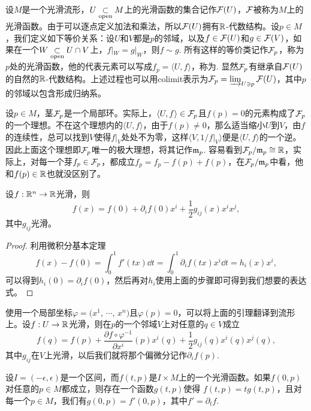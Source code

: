 \begin{para}
设$M$是一个光滑流形，$U\underset{\mathrm{open}}{\subset} M$上的光滑函数的集合记作$\mathcal{F}(U)$，$\mathcal{F}$被称为$M$上的光滑函数。由于可以逐点定义加法和乘法，所以$\mathcal{F}(U)$拥有$\mathbb{R}$-代数结构。设$p\in M$，我们定义如下等价关系：设$U$和$V$都是$p$的邻域，以及$f\in \mathcal{F}(U)$和$g\in \mathcal{F}(V)$，如果在一个$W\underset{\mathrm{open}}{\subset} U\cap V$上，$f|_W=g|_W$，则$f\sim g$. 所有这样的等价类记作$\mathcal{F}_p$，称为$p$处的光滑函数，他的代表元素可以写成$f_p=\langle U,f\rangle$，称为. 显然$\mathcal{F}_p$有继承自$\mathcal{F}(U)$的自然的$\mathbb{R}$-代数结构。上述过程也可以用colimit表示为$\mathcal{F}_p=\varinjlim_{U\ni p}\mathcal{F}(U)$，其中$p$的邻域以包含形成归纳系。

设$p\in M$，茎$\mathcal{F}_p$是一个局部环。实际上，$\langle U,f\rangle \in \mathcal{F}_p$且$f(p)= 0$的元素构成了$\mathcal{F}_p$的一个理想。不在这个理想内的$\langle U,f\rangle$，由于$f(p)\neq 0$，那么适当缩小$U$到$V$，由$f$的连续性，总可以找到$V$使得$f|_V$处处不为零，这样$\langle V,1/f|_V\rangle$便是$\langle U,f\rangle$的一个逆。因此上面这个理想即$\mathcal{F}_p$唯一的极大理想，将其记作$\mathfrak{m}_p$. 容易看到$\mathcal{F}_p/\mathfrak{m}_p\cong \mathbb{R}$，实际上，对每一个芽$f_p\in\mathcal{F}_p$，都成立$f_p=f_p-f(p)+f(p)$，在$\mathcal{F}_p/\mathfrak{m}_p$中看，他和$f(p)\in\mathbb{R}$也就没区别了。
\end{para}

\begin{lem}
设$f:\mathbb{R}^n\to \mathbb{R}$光滑，则
\[
	f(x)=f(0)+\partial_if(0)x^i+\frac{1}{2}g_{ij}(x)x^ix^j,
\]
其中$g_{ij}$光滑。
\end{lem}

\begin{proof}
利用微积分基本定理
\[
	f(x)-f(0)=\int_0^1f'(tx)\dd t=\int_0^1\partial_i f(tx)x^i\dd t=h_i(x)x^i,
\]
可以得到$h_i(0)=\partial_i f(0)$，然后再对$h_i$使用上面的步骤即可得到我们想要的表达式。
\end{proof}

使用一个局部坐标$\varphi=(x^1$, $\cdots$, $x^n)$且$\varphi(p)=0$，可以将上面的引理翻译到流形上。设$f:U\to \mathbb{R}$光滑，则在$p$的一个邻域$V$上对任意的$q\in V$成立
\[
	f(q)=f(p)+\frac{\partial f\circ \varphi^{-1}}{\partial x^i}(p)x^i(q)+\frac{1}{2}g_{ij}(q)x^i(q)x^j(q),
\]
其中$g_{ij}$在$V$上光滑，以后我们就将那个偏微分记作$\partial_i f(p)$.

\begin{lem}
\label{lem:1.5}设$I=(-\epsilon,\epsilon)$是一个区间，而$f(t,p)$是$I\times M$上的一个光滑函数。如果$f(0,p)$对任意的$p\in M$都成立，则存在一个函数$g(t,p)$使得
$f(t,p)=tg(t,p)$，且对每一个$p\in M$，我们有$g(0,p)=f'(0,p)$，其中$f'=\partial_t f$.
\end{lem}

